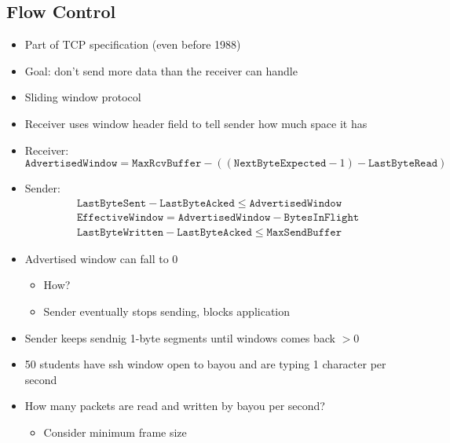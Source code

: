 \subsection{Flow Control}
\begin{itemize}[nosep]
    \item Part of TCP specification (even before 1988)
    \item Goal: don't send more data than the receiver can handle
    \item Sliding window protocol
    \item Receiver uses window header field to tell sender how much space it has
    \item Receiver: \[\texttt{AdvertisedWindow} = \texttt{MaxRcvBuffer} - ((\texttt{NextByteExpected} - 1) - \texttt{LastByteRead})\]
    \item Sender:
          \begin{align*}
               & \texttt{LastByteSent} - \texttt{LastByteAcked}     \leq \texttt{AdvertisedWindow}                       \\
               & \texttt{EffectiveWindow}                           = \texttt{AdvertisedWindow} - \texttt{BytesInFlight} \\
               & \texttt{LastByteWritten} - \texttt{LastByteAcked}  \leq \texttt{MaxSendBuffer}
          \end{align*}
    \item Advertised window can fall to 0
          \begin{itemize}[nosep]
              \item How?
              \item Sender eventually stops sending, blocks application
          \end{itemize}
    \item Sender keeps sendnig 1-byte segments until windows comes back $> 0$
    \item 50 students have ssh window open to bayou and are typing 1 character per second
    \item How many packets are read and written by bayou per second?
          \begin{itemize}[nosep]
              \item Consider minimum frame size
          \end{itemize}
\end{itemize}
